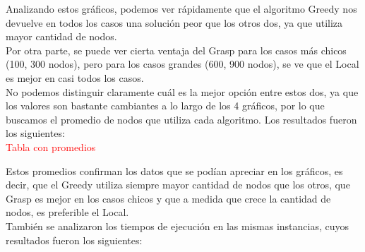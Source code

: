 Analizando estos gr\'aficos, podemos ver r\'apidamente que el algoritmo Greedy nos devuelve en todos los casos una soluci\'on peor que los otros dos, ya que utiliza mayor cantidad de nodos.\\
Por otra parte, se puede ver cierta ventaja del Grasp para los casos m\'as chicos (100, 300 nodos), pero para los casos grandes (600, 900 nodos), se ve que el Local es mejor en casi todos los casos.\\

No podemos distinguir claramente cu\'al es la mejor opci\'on entre estos dos, ya que los valores son bastante cambiantes a lo largo de los 4 gr\'aficos, por lo que buscamos el promedio de nodos que utiliza
cada algoritmo. Los resultados fueron los siguientes:\\

\textcolor{red}{Tabla con promedios}

Estos promedios confirman los datos que se pod\'ian apreciar en los gr\'aficos, es decir, que el Greedy utiliza siempre mayor cantidad de nodos que los otros, que Grasp es mejor en los casos chicos y
que a medida que crece la cantidad de nodos, es preferible el Local.\\

También se analizaron los tiempos de ejecución en las mismas instancias, cuyos resultados fueron los siguientes:

